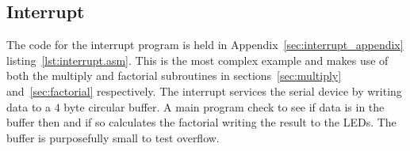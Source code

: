





\subsection{Interrupt}
The code for the interrupt program is held in Appendix~\ref{sec:interrupt_appendix} listing~\ref{lst:interrupt.asm}.
This is the most complex example and makes use of both the multiply and factorial subroutines in sections~\ref{sec:multiply} and~\ref{sec:factorial} respectively.
The interrupt services the serial device by writing data to a $4$ byte circular buffer. 
A main program check to see if data is in the buffer then and if so calculates the factorial writing the result to the LEDs.
The buffer is purposefully small to test overflow.






